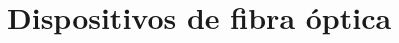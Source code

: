\documentclass[12pt,fleqn,a4paper,oneside]{LegrandOrangeBook}
\begin{document}
%
%
%
\part{Dispositivos de fibra óptica}
\end{document}
